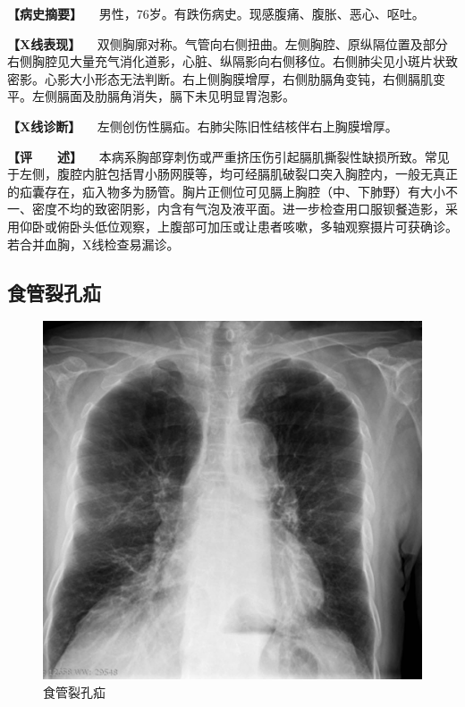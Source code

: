 \textbf{【病史摘要】}
　男性，76岁。有跌伤病史。现感腹痛、腹胀、恶心、呕吐。

\textbf{【X线表现】}
　双侧胸廓对称。气管向右侧扭曲。左侧胸腔、原纵隔位置及部分右侧胸腔见大量充气消化道影，心脏、纵隔影向右侧移位。右侧肺尖见小斑片状致密影。心影大小形态无法判断。右上侧胸膜增厚，右侧肋膈角变钝，右侧膈肌变平。左侧膈面及肋膈角消失，膈下未见明显胃泡影。

\textbf{【X线诊断】} 　左侧创伤性膈疝。右肺尖陈旧性结核伴右上胸膜增厚。

\textbf{【评　　述】}
　本病系胸部穿刺伤或严重挤压伤引起膈肌撕裂性缺损所致。常见于左侧，腹腔内脏包括胃小肠网膜等，均可经膈肌破裂口突入胸腔内，一般无真正的疝囊存在，疝入物多为肠管。胸片正侧位可见膈上胸腔（中、下肺野）有大小不一、密度不均的致密阴影，内含有气泡及液平面。进一步检查用口服钡餐造影，采用仰卧或俯卧头低位观察，上腹部可加压或让患者咳嗽，多轴观察摄片可获确诊。若合并血胸，X线检查易漏诊。

\subsection{食管裂孔疝}

\begin{figure}[!htbp]
 \centering
 \includegraphics{./images/Image00203.jpg}
 \captionsetup{justification=centering}
 \caption{食管裂孔疝}
 \label{fig3-13-2}
  \end{figure} 

